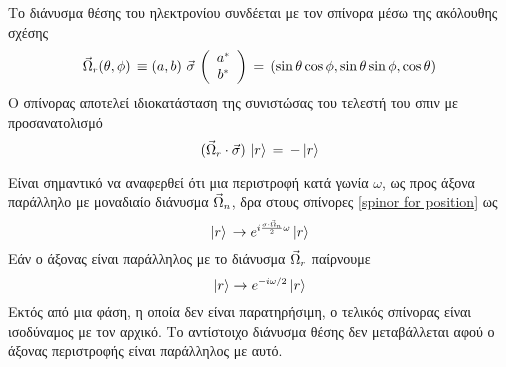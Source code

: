 Το διάνυσμα θέσης του ηλεκτρονίου συνδέεται με τον σπίνορα μέσω της ακόλουθης σχέσης 
\begin{equation}\label{position vector and spinor}
    \vec{\Omega}\subscr{r}(\theta,\phi)\,\equiv\left(a,b\right)\,\Vec{\sigma}\,\left(\begin{array}{c}a\superscr{*}\\b\superscr{*}\end{array}\right)\,=\,(\sin\theta\cos\phi,\sin\theta\sin\phi,\cos\theta)
\end{equation}
Ο σπίνορας αποτελεί ιδιοκατάσταση της συνιστώσας του τελεστή του σπιν με προσανατολισμό
\begin{equation*}
    (\vec{\Omega}\subscr{r}\cdot\Vec{\sigma})\,\left|r\right>\,=\,-\left|r\right>
\end{equation*}

Είναι σημαντικό να αναφερθεί ότι μια περιστροφή κατά γωνία $\omega$, ως προς άξονα παράλληλο με μοναδιαίο διάνυσμα $\vec{\Omega}\subscr{n}$, δρα στους σπίνορες \eqref{spinor for position} ως 
\begin{equation*}
    \left|r\right>\,\rightarrow e\superscr{i\frac{\sigma\cdot\vec{\Omega}\subscr{n}}{2}\omega}\left|r\right>
\end{equation*}
Εάν ο άξονας είναι παράλληλος με το διάνυσμα $\vec{\Omega}\subscr{r}$ 
παίρνουμε 
\begin{equation}\label{rotation of pos vec wr to parallel axis}
    \left|r\right>\rightarrow e\superscr{-i\omega/2}\left|r\right>
\end{equation}
Εκτός από μια φάση, η οποία δεν είναι παρατηρήσιμη,
ο τελικός σπίνορας είναι ισοδύναμος με τον αρχικό. Το αντίστοιχο διάνυσμα θέσης δεν μεταβάλλεται αφού ο άξονας περιστροφής είναι παράλληλος με αυτό.\\


